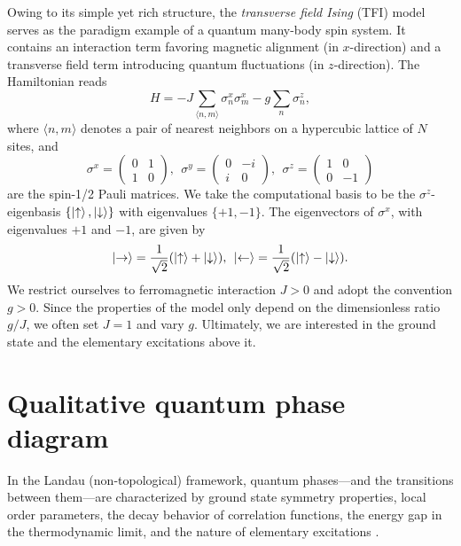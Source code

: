 Owing to its simple yet rich structure, the \textit{transverse field Ising} (TFI) model serves as the paradigm example of a quantum many-body spin system. It contains an interaction term favoring magnetic alignment (in $x$-direction) and a transverse field term introducing quantum fluctuations (in $z$-direction). The Hamiltonian reads
\begin{equation} \label{eq:tfi_hamiltonian}
	H = -J \sum_{\langle n,m \rangle} \sigma^x_n \sigma^x_m - g \sum_n \sigma^z_n,	
\end{equation}
where $\langle n,m \rangle$ denotes a pair of nearest neighbors on a hypercubic lattice of $N$ sites, and
\begin{equation}
\sigma^x = \begin{pmatrix} 0 & 1 \\ 1 & 0 \end{pmatrix}, \:\: \sigma^y = \begin{pmatrix} 0 & -i \\ i & 0 \end{pmatrix}, \:\: \sigma^z = \begin{pmatrix} 1 & 0 \\ 0 & -1 \end{pmatrix}
\end{equation}
are the spin-1/2 Pauli matrices. We take the computational basis to be the $\sigma^z$-eigenbasis $\{\ket{\uparrow}, \ket{\downarrow}\}$ with eigenvalues $\{+1, -1\}$. The eigenvectors of $\sigma^x$, with eigenvalues $+1$ and $-1$, are given by
\begin{equation}
\ket{\rightarrow} = \frac{1}{\sqrt{2}}(\ket{\uparrow}+\ket{\downarrow}), \:\: \ket{\leftarrow}=\frac{1}{\sqrt{2}}(\ket{\uparrow}-\ket{\downarrow}).
\end{equation}
We restrict ourselves to ferromagnetic interaction $J > 0$ and adopt the convention $g > 0$. Since the properties of the model only depend on the dimensionless ratio $g/J$, we often set $J = 1$ and vary $g$. Ultimately, we are interested in the ground state and the elementary excitations above it.


\section{Qualitative quantum phase diagram} \label{sec:tfi_phase_diagram}
In the Landau (non-topological) framework, quantum phases---and the transitions between them---are characterized by ground state symmetry properties, local order parameters, the decay behavior of correlation functions, the energy gap in the thermodynamic limit, and the nature of elementary excitations \cite{sachdev2011quantum}.  \\

